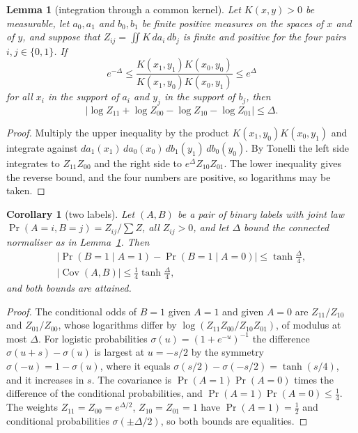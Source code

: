 \documentclass[11pt]{amsart}
\newtheorem{lemma}[theorem]{Lemma}
\newtheorem{corollary}[theorem]{Corollary}
\theoremstyle{definition}
\theoremstyle{remark}
\numberwithin{equation}{section}
\newcommand{\Cov}{\operatorname{Cov}}
\begin{document}
\begin{lemma}[integration through a common kernel]\label{lem:kernel}
Let $K(x,y)>0$ be measurable, let $a_0,a_1$ and $b_0,b_1$ be finite
positive measures on the spaces of $x$ and of $y$, and suppose that
$Z_{ij}=\iint K\,da_i\,db_j$ is finite and positive for the four pairs
$i,j\in\{0,1\}$. If
\[
e^{-\varDelta}\le\frac{K(x_1,y_1)K(x_0,y_0)}{K(x_1,y_0)K(x_0,y_1)}\le
e^{\varDelta}
\]
for all $x_i$ in the support of $a_i$ and $y_j$ in the support of $b_j$,
then
\[
\bigl|\log Z_{11}+\log Z_{00}-\log Z_{10}-\log Z_{01}\bigr|\le\varDelta .
\]
\end{lemma}

\begin{proof}
Multiply the upper inequality by the product $K(x_1,y_0)K(x_0,y_1)$ and
integrate against $da_1(x_1)\,da_0(x_0)\,db_1(y_1)\,db_0(y_0)$. By Tonelli
the left side integrates to $Z_{11}Z_{00}$ and the right side to
$e^{\varDelta}Z_{10}Z_{01}$. The lower inequality gives the reverse bound, and the four
numbers are positive, so logarithms may be taken.
\end{proof}

\begin{corollary}[two labels]\label{cor:twolabels}
Let $(A,B)$ be a pair of binary labels with joint law $\Pr(A=i,B=j)=Z_{ij}
/\sum Z$, all $Z_{ij}>0$, and let $\varDelta$ bound the connected
normaliser as in Lemma~\ref{lem:kernel}. Then
\[
\begin{gathered}
\bigl|\Pr(B=1\mid A=1)-\Pr(B=1\mid A=0)\bigr|\le\tanh\frac\varDelta4,\\
|\Cov(A,B)|\le\frac14\tanh\frac\varDelta4 ,
\end{gathered}
\]
and both bounds are attained.
\end{corollary}

\begin{proof}
The conditional odds of $B=1$ given $A=1$ and given $A=0$ are $Z_{11}/
Z_{10}$ and $Z_{01}/Z_{00}$, whose logarithms differ by $\log(Z_{11}Z_{00}/
Z_{10}Z_{01})$, of modulus at most $\varDelta$. For logistic probabilities
$\sigma(u)=(1+e^{-u})^{-1}$ the difference $\sigma(u+s)-\sigma(u)$ is
largest at $u=-s/2$ by the symmetry $\sigma(-u)=1-\sigma(u)$, where it
equals $\sigma(s/2)-\sigma(-s/2)=\tanh(s/4)$, and it increases in $s$. The
covariance is $\Pr(A=1)\Pr(A=0)$ times the difference of the conditional
probabilities, and $\Pr(A=1)\Pr(A=0)\le\frac14$. The weights
$Z_{11}=Z_{00}=e^{\varDelta/2}$, $Z_{10}=Z_{01}=1$ have $\Pr(A=1)=\frac12$
and conditional probabilities $\sigma(\pm\varDelta/2)$, so both bounds are
equalities.
\end{proof}
\end{document}
